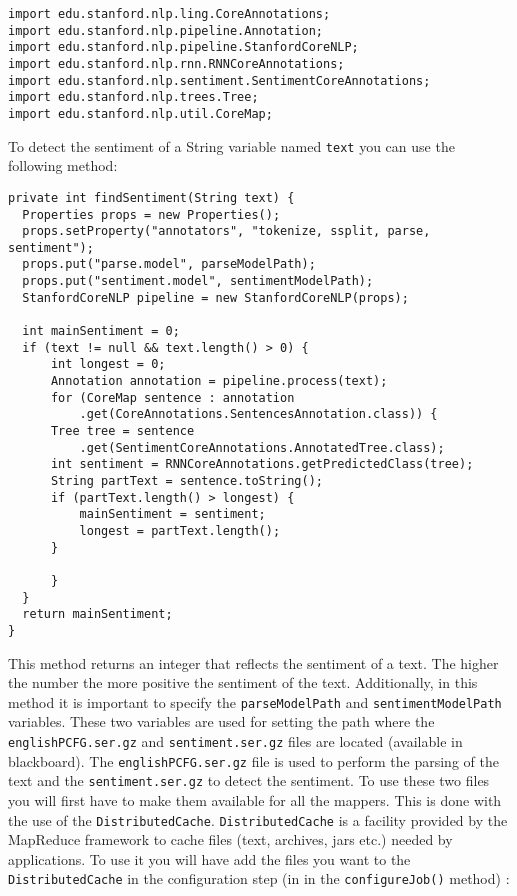 \documentclass[a4paper,10pt]{article}
\begin{document}
\begin{lstlisting}
import edu.stanford.nlp.ling.CoreAnnotations;
import edu.stanford.nlp.pipeline.Annotation;
import edu.stanford.nlp.pipeline.StanfordCoreNLP;
import edu.stanford.nlp.rnn.RNNCoreAnnotations;
import edu.stanford.nlp.sentiment.SentimentCoreAnnotations;
import edu.stanford.nlp.trees.Tree;
import edu.stanford.nlp.util.CoreMap;
\end{lstlisting}

To detect the sentiment of a String variable named \texttt{text} you can use the following method:
\begin{lstlisting}
private int findSentiment(String text) {
  Properties props = new Properties();
  props.setProperty("annotators", "tokenize, ssplit, parse, sentiment");
  props.put("parse.model", parseModelPath);
  props.put("sentiment.model", sentimentModelPath);
  StanfordCoreNLP pipeline = new StanfordCoreNLP(props);

  int mainSentiment = 0;
  if (text != null && text.length() > 0) {
      int longest = 0;
      Annotation annotation = pipeline.process(text);
      for (CoreMap sentence : annotation
	      .get(CoreAnnotations.SentencesAnnotation.class)) {
	  Tree tree = sentence
		  .get(SentimentCoreAnnotations.AnnotatedTree.class);
	  int sentiment = RNNCoreAnnotations.getPredictedClass(tree);
	  String partText = sentence.toString();
	  if (partText.length() > longest) {
	      mainSentiment = sentiment;
	      longest = partText.length();
	  }

      }
  }
  return mainSentiment;
}
\end{lstlisting}

This method returns an integer that reflects the sentiment of a text. The higher the number the more positive the sentiment of the text. Additionally,  in this method it is important to specify the \texttt{parseModelPath} and \texttt{sentimentModelPath} variables. These two variables are used for setting the path where the \texttt{englishPCFG.ser.gz} and \texttt{sentiment.ser.gz} files are located (available in blackboard). The \texttt{englishPCFG.ser.gz} file is used to perform the parsing of the text and the \texttt{sentiment.ser.gz} to detect the sentiment. To use these two files you will first have to make them available for all the mappers. This is done with the use of the \texttt{DistributedCache}. \texttt{DistributedCache} is a facility provided by the MapReduce framework to cache files (text, archives, jars etc.) needed by applications. To use it you will have add the files you want to the \texttt{DistributedCache} in the configuration step (in in the \texttt{configureJob()} method) :
\end{document}
